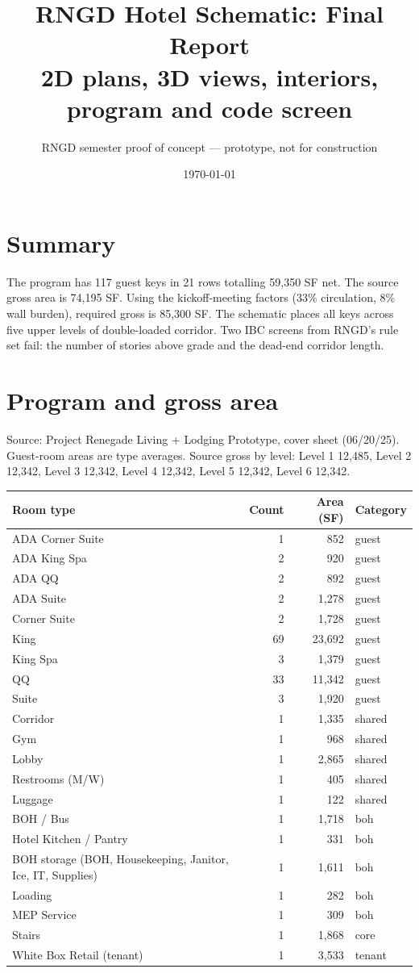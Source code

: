 \documentclass[10pt]{article}
\title{RNGD Hotel Schematic: Final Report\\\large 2D plans, 3D views, interiors, program and code screen}
\author{RNGD semester proof of concept --- prototype, not for construction}
\date{\today}
\begin{document}
\maketitle
\tableofcontents

\section{Summary}
The program has 117 guest keys in 21 rows totalling 59,350 SF net. The source gross
area is 74,195 SF. Using the kickoff-meeting factors (33\% circulation, 8\% wall burden), required gross
is 85,300 SF. The schematic places all keys across five upper levels of double-loaded corridor.
Two IBC screens from RNGD's rule set fail: the number of stories above grade and the dead-end corridor length.

\section{Program and gross area}
Source: Project Renegade Living + Lodging Prototype, cover sheet (06/20/25). Guest-room areas are type averages. Source gross by level: Level 1 12,485, Level 2 12,342, Level 3 12,342, Level 4 12,342, Level 5 12,342, Level 6 12,342.
\begin{longtable}{p{7.4cm}rrl}\toprule Room type & Count & Area (SF) & Category \\ \midrule
ADA Corner Suite & 1 & 852 & guest \\
ADA King Spa & 2 & 920 & guest \\
ADA QQ & 2 & 892 & guest \\
ADA Suite & 2 & 1,278 & guest \\
Corner Suite & 2 & 1,728 & guest \\
King & 69 & 23,692 & guest \\
King Spa & 3 & 1,379 & guest \\
QQ & 33 & 11,342 & guest \\
Suite & 3 & 1,920 & guest \\
Corridor & 1 & 1,335 & shared \\
Gym & 1 & 968 & shared \\
Lobby & 1 & 2,865 & shared \\
Restrooms (M/W) & 1 & 405 & shared \\
Luggage & 1 & 122 & shared \\
BOH / Bus & 1 & 1,718 & boh \\
Hotel Kitchen / Pantry & 1 & 331 & boh \\
BOH storage (BOH, Housekeeping, Janitor, Ice, IT, Supplies) & 1 & 1,611 & boh \\
Loading & 1 & 282 & boh \\
MEP Service & 1 & 309 & boh \\
Stairs & 1 & 1,868 & core \\
White Box Retail (tenant) & 1 & 3,533 & tenant \\
\bottomrule\end{longtable}
\end{document}
